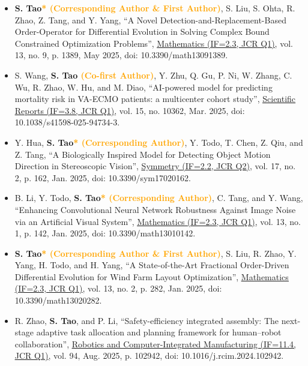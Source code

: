 \documentclass[11pt,a4paper,sans]{moderncv}
\renewcommand{\underline}[1]{\uline{#1}}
\begin{document}
{\begin{itemize}[label=\textbullet]
      \item [25)] \textbf{S. Tao\textcolor{orange}{* (Corresponding Author \& First Author)}}, S. Liu, S. Ohta, R. Zhao, Z. Tang, and Y. Yang, “A Novel Detection-and-Replacement-Based Order-Operator for Differential Evolution in Solving Complex Bound Constrained Optimization Problems”, \color{black}\href{https://www.mdpi.com/journal/mathematics}{\underline{Mathematics (IF=2.3, JCR Q1)}}, vol. 13, no. 9, p. 1389, May 2025, doi: 10.3390/math13091389.

      \item [24)] S. Wang, \textbf{S. Tao \textcolor{orange}{(Co-first Author)}}, Y. Zhu, Q. Gu, P. Ni, W. Zhang, C. Wu, R. Zhao, W. Hu, and M. Diao, “AI-powered model for predicting mortality risk in VA-ECMO patients: a multicenter cohort study”, \color{black}\href{https://www.nature.com/srep/}{\underline{Scientific Reports (IF=3.8, JCR Q1)}}, vol. 15, no. 10362, Mar. 2025, doi: 10.1038/s41598-025-94734-3. 
            
      \item [23)] Y. Hua, \textbf{S. Tao\textcolor{orange}{* (Corresponding Author)}}, Y. Todo, T. Chen, Z. Qiu, and Z. Tang, “A Biologically Inspired Model for Detecting Object Motion Direction in Stereoscopic Vision”, \color{black}\href{https://www.mdpi.com/journal/symmetry}{\underline{Symmetry (IF=2.2, JCR Q2)}}, vol. 17, no. 2, p. 162, Jan. 2025, doi: 10.3390/sym17020162.
      
      \item [22)] B. Li, Y. Todo, \textbf{S. Tao\textcolor{orange}{* (Corresponding Author)}}, C. Tang, and Y. Wang, “Enhancing Convolutional Neural Network Robustness Against Image Noise via an Artificial Visual System”, \color{black}\href{https://www.mdpi.com/journal/mathematics}{\underline{Mathematics (IF=2.3, JCR Q1)}}, vol. 13, no. 1, p. 142, Jan. 2025, doi: 10.3390/math13010142.
      
      \item [21)] \textbf{S. Tao\textcolor{orange}{* (Corresponding Author \& First Author)}}, S. Liu, R. Zhao, Y. Yang, H. Todo, and H. Yang, “A State-of-the-Art Fractional Order-Driven Differential Evolution for Wind Farm Layout Optimization”, \color{black}\href{https://www.mdpi.com/journal/mathematics}{\underline{Mathematics (IF=2.3, JCR Q1)}}, vol. 13, no. 2, p. 282, Jan. 2025, doi: 10.3390/math13020282.
      
      \item [20)] R. Zhao, \textbf{S. Tao}, and P. Li, “Safety-efficiency integrated assembly: The next-stage adaptive task allocation and planning framework for human–robot collaboration”, \color{black}\href{https://www.sciencedirect.com/journal/robotics-and-computer-integrated-manufacturing}{\underline{Robotics and Computer-Integrated Manufacturing (IF=11.4, JCR Q1)}}, vol. 94, Aug. 2025, p. 102942, doi: 10.1016/j.rcim.2024.102942.
      

\end{itemize}}
\end{document}
